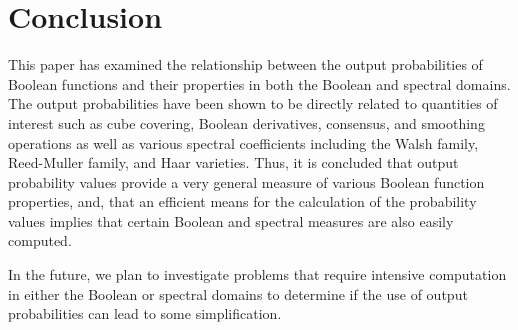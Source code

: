 \section{Conclusion}
This paper has examined the relationship between the output probabilities of
Boolean functions and their properties in both the Boolean and spectral domains.
The output probabilities have been shown to be directly related to quantities of
interest such as cube covering, Boolean derivatives, consensus, and smoothing
operations as well as various spectral coefficients including the Walsh family,
Reed-Muller family, and Haar varieties.  Thus, it is concluded that output probability
values provide a very general measure of various Boolean function properties, and, 
that an efficient means for the calculation of the probability values implies that
certain Boolean and spectral measures are also easily computed.

In the future, we plan to investigate problems that require intensive computation
in either the Boolean or spectral domains to determine if the use of output
probabilities can lead to some simplification.

